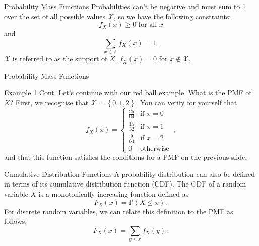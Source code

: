 \documentclass[10pt]{beamer}
\begin{document}
\begin{frame}[fragile]{Probability Mass Functions}
Probabilities can't be negative and must sum to 1 over the set of all possible values \(\mathcal{X}\), so we have the following constraints:
\begin{equation*}
    f_X\left(x\right) \geq 0 \text{ for all } x
\end{equation*}
and
\begin{equation*}
    \sum_{x \in \mathcal{X}} f_X\left(x\right) = 1\,.
\end{equation*}
\(\mathcal{X}\) is referred to as the support of \(X\). \(f_X\left(x\right) = 0\) for \(x \notin \mathcal{X}\).
\end{frame}

\begin{frame}[fragile]{Probability Mass Functions}
\begin{exampleblock}{Example 1 Cont.}
Let's continue with our red ball example. What is the PMF of \(X\)? First, we recognise that \(\mathcal{X} = \left\{0, 1, 2\right\}\). You can verify for yourself that
\begin{equation*}
    f_X\left(x\right) =
    \begin{cases}
        \frac{25}{64} & \text{if } x = 0\\
        \frac{15}{32} & \text{if } x = 1\\
        \frac{9}{64} & \text{if } x = 2\\
        0 & \text{otherwise}
    \end{cases}\,,
\end{equation*}
and that this function satisfies the conditions for a PMF on the previous slide.
\end{exampleblock}
\end{frame}

\begin{frame}[fragile]{Cumulative Distribution Functions}
A probability distribution can also be defined in terms of its cumulative distribution function (CDF). The CDF of a random variable \(X\) is a monotonically increasing function defined as
\begin{equation*}
    F_X\left(x\right) = \mathbb{P}\left(X \leq x\right)\,.
\end{equation*}
For discrete random variables, we can relate this definition to the PMF as follows:
\begin{equation*}
    F_X\left(x\right) = \sum_{y\leq x} f_X\left(y\right)\,.
\end{equation*}
\end{frame}
\end{document}
